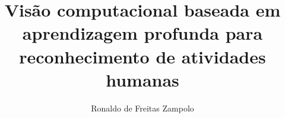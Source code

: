 

\title{Visão computacional baseada em aprendizagem profunda para reconhecimento de atividades humanas}

\author[1]{Ronaldo de Freitas Zampolo}



\maketitle




